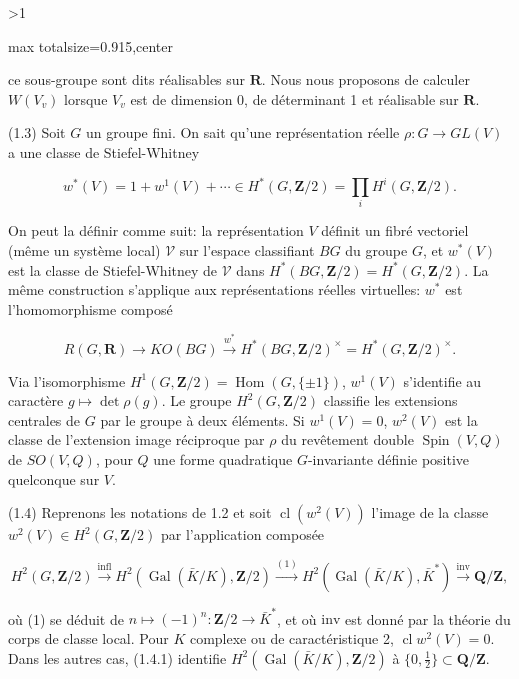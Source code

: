 \documentclass[9pt,twoside]{extarticle}
\newcommand{\EditionPage}[3]{%
  \ifnum#1>1\clearpage\fi
  \pdfbookmark[1]{Printed folio #2}{fr-folio-#2}%
  \hypertarget{fr-page-#1}{}%
  \noindent\begin{adjustbox}{max totalsize={\textwidth}{0.915\textheight},center}
  \begin{minipage}[t]{\textwidth}
  \fontsize{8.45}{10.05}\selectfont\justifying
  #3
  \end{minipage}
  \end{adjustbox}%
}
\begin{document}
\EditionPage{3}{301}{%
ce sous-groupe sont dits réalisables sur \(\mathbf R\). Nous nous proposons de calculer \(W(V_v)\) lorsque \(V_v\) est de dimension 0, de déterminant 1 et réalisable sur \(\mathbf R\).\par

(1.3) Soit \(G\) un groupe fini. On sait qu’une représentation réelle \(\rho:G\to GL(V)\) a une classe de Stiefel-Whitney\par

\[
w^*(V)=1+w^1(V)+\cdots\in H^*(G,\mathbf Z/2)=\prod_i H^i(G,\mathbf Z/2).
\]

On peut la définir comme suit: la représentation \(V\) définit un fibré vectoriel (même un système local) \(\mathcal V\) sur l’espace classifiant \(BG\) du groupe \(G\), et \(w^*(V)\) est la classe de Stiefel-Whitney de \(\mathcal V\) dans \(H^*(BG,\mathbf Z/2)=H^*(G,\mathbf Z/2)\). La même construction s’applique aux représentations réelles virtuelles: \(w^*\) est l’homomorphisme composé\par

\[
R(G,\mathbf R)\longrightarrow KO(BG)\overset{w^*}{\longrightarrow}H^*(BG,\mathbf Z/2)^\times=H^*(G,\mathbf Z/2)^\times.
\]

Via l’isomorphisme \(H^1(G,\mathbf Z/2)=\operatorname{Hom}(G,\{\pm1\})\), \(w^1(V)\) s’identifie au caractère \(g\mapsto\det\rho(g)\). Le groupe \(H^2(G,\mathbf Z/2)\) classifie les extensions centrales de \(G\) par le groupe à deux éléments. Si \(w^1(V)=0\), \(w^2(V)\) est la classe de l’extension image réciproque par \(\rho\) du revêtement double \(\operatorname{Spin}(V,Q)\) de \(SO(V,Q)\), pour \(Q\) une forme quadratique \(G\)-invariante définie positive quelconque sur \(V\).\par

(1.4) Reprenons les notations de 1.2 et soit \(\operatorname{cl}(w^2(V))\) l’image de la classe \(w^2(V)\in H^2(G,\mathbf Z/2)\) par l’application composée\par

\[
\tag{1.4.1}
H^2(G,\mathbf Z/2)\overset{\mathrm{infl}}{\longrightarrow}H^2(\operatorname{Gal}(\bar K/K),\mathbf Z/2)
\overset{(1)}{\longrightarrow}H^2(\operatorname{Gal}(\bar K/K),\bar K^*)
\overset{\mathrm{inv}}{\longrightarrow}\mathbf Q/\mathbf Z,
\]

où (1) se déduit de \(n\mapsto(-1)^n:\mathbf Z/2\to\bar K^*\), et où \(\mathrm{inv}\) est donné par la théorie du corps de classe local. Pour \(K\) complexe ou de caractéristique 2, \(\operatorname{cl}w^2(V)=0\). Dans les autres cas, (1.4.1) identifie \(H^2(\operatorname{Gal}(\bar K/K),\mathbf Z/2)\) à \(\{0,\tfrac12\}\subset\mathbf Q/\mathbf Z\).\par

}
\end{document}
